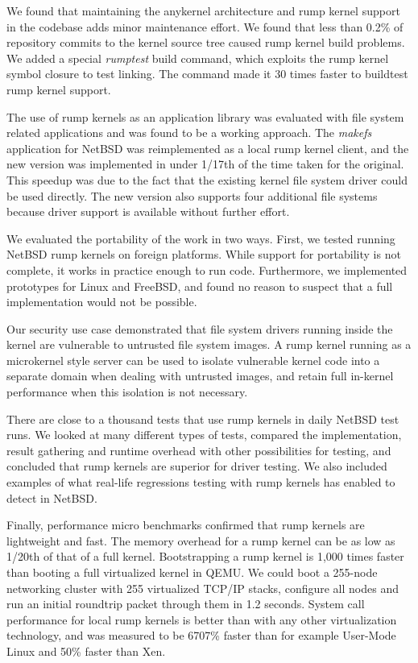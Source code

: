 We found that maintaining the anykernel architecture and rump kernel
support in the codebase adds minor maintenance effort.  We found
that less than 0.2\% of repository commits to the kernel source
tree caused rump kernel build problems.  We added a special \textit{rumptest}
build command, which exploits the rump kernel symbol closure to
test linking.  The command made it 30 times faster to buildtest
rump kernel support.

The use of rump kernels as an application library was evaluated
with file system related applications and was found to be a working
approach.  The \textit{makefs} application for NetBSD was reimplemented
as a local rump kernel client, and the new version was implemented
in under 1/17th of the time taken for the original.  This speedup
was due to the fact that the existing kernel file system driver
could be used directly.  The new version also supports four additional
file systems because driver support is available without further effort.

We evaluated the portability of the work in two ways.  First, we
tested running NetBSD rump kernels on foreign platforms.  While
support for portability is not complete, it works in practice
enough to run code.  Furthermore, we implemented prototypes
for Linux and FreeBSD, and found no reason to
suspect that a full implementation would not be possible.

Our security use case demonstrated that file system drivers running
inside the kernel are vulnerable to untrusted file system images.
A rump kernel running as a microkernel style server can be used to
isolate vulnerable kernel code into a separate domain when dealing
with untrusted images, and retain full in-kernel performance when
this isolation is not necessary.

There are close to a thousand tests that use rump kernels in daily
NetBSD test runs.  We looked at many different types of tests,
compared the implementation, result gathering and runtime overhead
with other possibilities for testing, and concluded that rump
kernels are superior for driver testing.  We also included examples
of what real-life regressions testing with rump kernels has enabled
to detect in NetBSD.

Finally, performance micro benchmarks confirmed that rump kernels
are lightweight and fast.  The memory overhead for a rump kernel
can be as low as 1/20th of that of a full kernel.  Bootstrapping
a rump kernel is 1,000 times faster than booting a full virtualized
kernel in QEMU.  We could boot a 255-node networking cluster with
255 virtualized TCP/IP stacks, configure all nodes and run an
initial roundtrip packet through them in 1.2 seconds.  System call
performance for local rump kernels is better than with any other
virtualization technology, and was measured to be 6707\% faster
than for example User-Mode Linux and 50\% faster than Xen.
